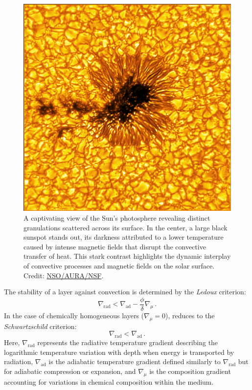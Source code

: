 \documentclass[main.tex]{subfiles}
\begin{document}
    \begin{figure}[ht!]
        \centering
        \includegraphics[scale=0.4]{figures/chapter1/sun_granulation.png}
        \caption{A captivating view of the Sun's photosphere revealing distinct granulations scattered across its surface. In the center, a large black sunspot stands out, its darkness attributed to a lower temperature caused by intense magnetic fields that disrupt the convective transfer of heat. This stark contrast highlights the dynamic interplay of convective processes and magnetic fields on the solar surface. Credit: \href{https://nso.edu/}{NSO/AURA/NSF}.}
        \label{fig:sun_granulation}
    \end{figure}

    The stability of a layer against convection is determined by the \textit{Ledoux} criterion:
    \begin{equation}\label{eq:ledoux}
        \nabla_{\text{rad}} < \nabla_{\text{ad}} - \frac{\phi}{\delta} \nabla_{\mu}\,.
    \end{equation}
    In the case of chemically homogeneous layers ($\nabla_{\mu} = 0$), reduces to the \emph{Schwartzschild} criterion:	
    \begin{equation}\label{eq:schwarzschild}
        \nabla_{\text{rad}} < \nabla_{\text{ad}}\,.
    \end{equation}
    Here, $\nabla_\mathrm{rad}$ represents the radiative temperature gradient describing the logarithmic temperature variation with depth when energy is transported by radiation, $\nabla_\mathrm{ad}$ is the adiabatic temperature gradient defined similarly to $\nabla_\mathrm{rad}$ but for adiabatic compression or expansion, and $\nabla_\mu$ is the composition gradient accounting for variations in chemical composition within the medium.
    
\end{document}
